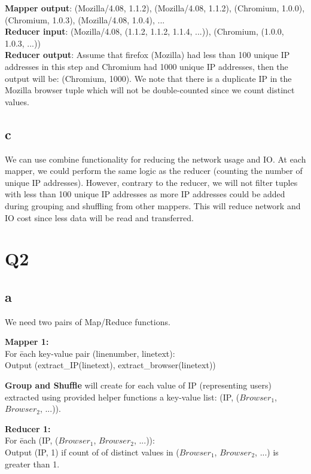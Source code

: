 \documentclass[10pt, letterpaper]{article}
\begin{document}
\noindent \textbf{Mapper output}: (Mozilla/4.08, 1.1.2), (Mozilla/4.08, 1.1.2), (Chromium, 1.0.0), (Chromium, 1.0.3), (Mozilla/4.08, 1.0.4), ...\\

\noindent \textbf{Reducer input}: (Mozilla/4.08, (1.1.2, 1.1.2, 1.1.4, ...)), (Chromium, (1.0.0, 1.0.3, ...))\\

\noindent \textbf{Reducer output}: Assume that firefox (Mozilla) had less than 100 unique IP addresses in this step and Chromium had 1000 unique IP addresses, then the output will be: (Chromium, 1000). We note that there is a duplicate IP in the Mozilla browser tuple which will not be double-counted since we count distinct values.

\subsection*{c}
We can use combine functionality for reducing the network usage and IO. At each mapper, we could perform the same logic as the reducer (counting the number of unique IP addresses). However, contrary to the reducer, we will not filter tuples with less than 100 unique IP addresses as more IP addresses could be added during grouping and shuffling from other mappers. This will reduce network and IO cost since less data will be read and transferred.
\section*{Q2}
\subsection*{a}
We need two pairs of Map/Reduce functions.\\

\begin{tabbing}
    \textbf{Mapper 1:}\\
    For \= each key-value pair (linenumber, linetext):\\
    \> Output (extract\_IP(linetext), extract\_browser(linetext))\\
\end{tabbing}
\textbf{Group and Shuffle} will create for each value of IP (representing users) extracted using provided helper functions a key-value list: (IP, ($Browser_1$, $Browser_2$, ...)).

\begin{tabbing}
    \textbf{Reducer 1:}\\
    For \= each (IP, ($Browser_1$, $Browser_2$, ...)):\\
    \> Output (IP, 1) if count of of distinct values in ($Browser_1$, $Browser_2$, ...) is greater than 1.
\end{tabbing}
\end{document}

